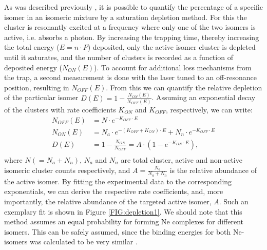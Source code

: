 As was described previously \citep{jusko_felion_2019,JSB2018}, it is possible to quantify the percentage of a specific isomer in an isomeric mixture by a saturation depletion method. For this the cluster is resonantly excited at a frequency where only one of the two isomers is active, i.e. absorbs a photon. By increasing the trapping time, thereby increasing the total energy ($E=n\cdot P$) deposited, only the active isomer cluster is depleted until it saturates, and the number of clusters is recorded as a function of deposited energy ($N_{ON}(E)$). To account for additional loss mechanisms from the trap, a second measurement is done with the laser tuned to an off-resonance position, resulting in $N_{OFF}(E)$. From this we can quantify the relative depletion of the particular isomer $D(E)=1-\frac{N_{ON}(E)}{N_{OFF}(E)}$. Assuming an  exponential decay of the clusters with rate coefficients $K_{ON}$ and $K_{OFF}$, respectively, we can write:
\begin{align*}
 N_{OFF}(E) &=  N \cdot e^{-K_{OFF}\cdot E}\\
 N_{ON}(E) &=  N_a \cdot e^{-(K_{OFF}+K_{ON}) \cdot  E} + N_n \cdot  e^{-K_{OFF} \cdot E}\\
 D(E) &= 1-\frac{N_{ON}}{N_{OFF}} = A \cdot (1-e^{-K_{ON} \cdot E}),\\
\label{eqn:depletion}
\end{align*}
where  $N(=N_a + N_n)$, $N_a$ and $N_n$ are total cluster, active and non-active isomeric cluster counts respectively, and $A=\frac{N_a}{N_a + N_n}$ is the relative abundance of the active isomer. By fitting the experimental data to the corresponding exponentials, we can derive the respective rate coefficients, and, more importantly, the relative abundance of the targeted active isomer, $A$. Such an exemplary fit is shown in Figure \ref{FIG:depletion1}. We should note that this method assumes an equal probability for forming Ne complexes for different isomers. This can be safely assumed, since the binding energies for both Ne-\iso isomers was calculated to be very similar \citep{Botschwina2011}.\\

